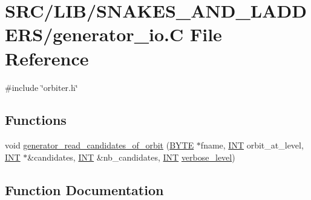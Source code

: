 \hypertarget{generator__io_8_c}{}\section{S\+R\+C/\+L\+I\+B/\+S\+N\+A\+K\+E\+S\+\_\+\+A\+N\+D\+\_\+\+L\+A\+D\+D\+E\+R\+S/generator\+\_\+io.C File Reference}
\label{generator__io_8_c}
{\ttfamily \#include \char`\"{}orbiter.\+h\char`\"{}}\newline
\subsection*{Functions}
\begin{DoxyCompactItemize}
\item 
void \mbox{\hyperlink{generator__io_8_c_a8566b2b334f5f196ed74dadd0efb2ed9}{generator\+\_\+read\+\_\+candidates\+\_\+of\+\_\+orbit}} (\mbox{\hyperlink{galois_8h_ab6cc7b4aeb6ea31aba2b3fbfc83ff5e6}{B\+Y\+TE}} $\ast$fname, \mbox{\hyperlink{galois_8h_a09fddde158a3a20bd2dcadb609de11dc}{I\+NT}} orbit\+\_\+at\+\_\+level, \mbox{\hyperlink{galois_8h_a09fddde158a3a20bd2dcadb609de11dc}{I\+NT}} $\ast$\&candidates, \mbox{\hyperlink{galois_8h_a09fddde158a3a20bd2dcadb609de11dc}{I\+NT}} \&nb\+\_\+candidates, \mbox{\hyperlink{galois_8h_a09fddde158a3a20bd2dcadb609de11dc}{I\+NT}} \mbox{\hyperlink{simeon_8_c_a818073fbcc2f439e7c56952f67386122}{verbose\+\_\+level}})
\end{DoxyCompactItemize}


\subsection{Function Documentation}
\mbox{\label{generator__io_8_c_a8566b2b334f5f196ed74dadd0efb2ed9}} 
